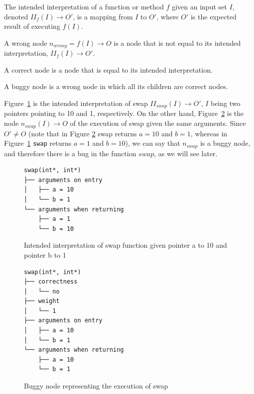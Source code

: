 \begin{definition}
The intended interpretation of a function or method \(f\) given an input set \(I\), denoted \(\mathit{II}_f(I) \to O'\), is a mapping from \(I\) to \(O'\), where \(O'\) is the expected result of executing \(f(I)\).
\end{definition}
\begin{definition}
A wrong node \(n_{wrong} = f(I) \to O\) is a node that is not equal to its intended interpretation, \(\mathit{II}_f(I) \to O'\).
\end{definition}
\begin{definition}
A correct node is a node that is equal to its intended interpretation.
\end{definition}
\begin{definition}
A buggy node is a wrong node in which all its children are correct nodes. 
\end{definition}
\theoremstyle{definition}
\begin{exmp}
Figure~\ref{fig:intendedInterpretationSwap} is the intended interpretation of swap \(\mathit{II}_{swap}(I) \to O'\), \(I\) being two pointers pointing to 10 and 1, respectively.
On the other hand, Figure~\ref{fig:buggySwap} is the node \(n_{swap}(I) \to O\) of the execution of swap given the same arguments.
Since \(O'\neq O\) (note that in Figure \ref{fig:buggySwap} swap returns \(a = 10\) and \(b = 1\), whereas in Figure~\ref{fig:intendedInterpretationSwap} \texttt{swap} returns \(a = 1\) and \(b = 10\)), we can say that \(n_{swap}\) is a buggy node, and therefore there is a bug in the function \(swap\), as we will see later.

\begin{figure}[h]
\caption{Intended interpretation of swap function given pointer a to 10 and pointer b to 1}
\label{fig:intendedInterpretationSwap}
\begin{verbatim}
swap(int*, int*)
├── arguments on entry
│   ├── a = 10
│   └── b = 1
└── arguments when returning
    ├── a = 1
    └── b = 10
\end{verbatim}
\end{figure}

\begin{figure}[h]
\caption{Buggy node representing the execution of swap}
\label{fig:buggySwap}
\begin{verbatim}
swap(int*, int*)
├── correctness
│   └── no
├── weight
│   └── 1
├── arguments on entry
│   ├── a = 10
│   └── b = 1
└── arguments when returning
    ├── a = 10
    └── b = 1
\end{verbatim}
\end{figure}

\end{exmp}

